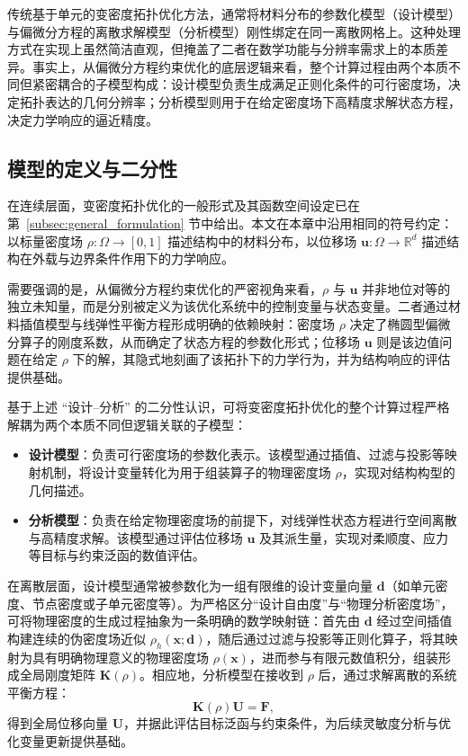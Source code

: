 传统基于单元的变密度拓扑优化方法，通常将材料分布的参数化模型（设计模型）与偏微分方程的离散求解模型（分析模型）刚性绑定在同一离散网格上。这种处理方式在实现上虽然简洁直观，但掩盖了二者在数学功能与分辨率需求上的本质差异。事实上，从偏微分方程约束优化的底层逻辑来看，整个计算过程由两个本质不同但紧密耦合的子模型构成：设计模型负责生成满足正则化条件的可行密度场，决定拓扑表达的几何分辨率；分析模型则用于在给定密度场下高精度求解状态方程，决定力学响应的逼近精度。


\subsection{模型的定义与二分性}
\label{subsec:model_definition_binarity}

在连续层面，变密度拓扑优化的一般形式及其函数空间设定已在第~\ref{subsec:general_formulation} 节中给出。本文在本章中沿用相同的符号约定：以标量密度场 $\rho:\Omega\rightarrow[0,1]$ 描述结构中的材料分布，以位移场 $\boldsymbol{u}:\Omega\rightarrow\mathbb{R}^{d}$ 描述结构在外载与边界条件作用下的力学响应。

需要强调的是，从偏微分方程约束优化的严密视角来看，$\rho$ 与 $\boldsymbol{u}$ 并非地位对等的独立未知量，而是分别被定义为该优化系统中的控制变量与状态变量。二者通过材料插值模型与线弹性平衡方程形成明确的依赖映射：密度场 $\rho$ 决定了椭圆型偏微分算子的刚度系数，从而确定了状态方程的参数化形式；位移场 $\boldsymbol{u}$ 则是该边值问题在给定 $\rho$ 下的解，其隐式地刻画了该拓扑下的力学行为，并为结构响应的评估提供基础。

基于上述 “设计--分析” 的二分性认识，可将变密度拓扑优化的整个计算过程严格解耦为两个本质不同但逻辑关联的子模型：
\begin{itemize}
	\item \textbf{设计模型}：负责可行密度场的参数化表示。该模型通过插值、过滤与投影等映射机制，将设计变量转化为用于组装算子的物理密度场 $\rho$，实现对结构构型的几何描述。
	
	\item \textbf{分析模型}：负责在给定物理密度场的前提下，对线弹性状态方程进行空间离散与高精度求解。该模型通过评估位移场 $\boldsymbol{u}$ 及其派生量，实现对柔顺度、应力等目标与约束泛函的数值评估。
\end{itemize}

在离散层面，设计模型通常被参数化为一组有限维的设计变量向量 $\boldsymbol{d}$（如单元密度、节点密度或子单元密度等）。为严格区分“设计自由度”与“物理分析密度场”，可将物理密度的生成过程抽象为一条明确的数学映射链：首先由 $\boldsymbol{d}$ 经过空间插值构建连续的伪密度场近似 $\rho_h(\boldsymbol{x};\boldsymbol{d})$，随后通过过滤与投影等正则化算子，将其映射为具有明确物理意义的物理密度场 $\rho(\boldsymbol{x})$，进而参与有限元数值积分，组装形成全局刚度矩阵 $\boldsymbol{K}(\rho)$。相应地，分析模型在接收到 $\rho$ 后，通过求解离散的系统平衡方程：
\[
\boldsymbol{K}(\rho)\boldsymbol{U} = \boldsymbol{F},
\]
得到全局位移向量 $\boldsymbol{U}$，并据此评估目标泛函与约束条件，为后续灵敏度分析与优化变量更新提供基础。

